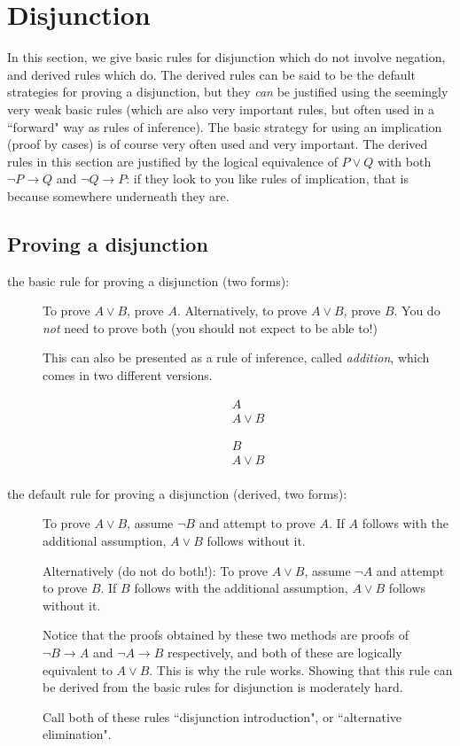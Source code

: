 \documentclass[12pt]{book}
\begin{document}
\section{Disjunction}

In this section, we give basic rules for disjunction which do not involve negation, and derived rules which do.  The derived rules can be said to be the default strategies for proving a disjunction, but they {\em can\/} be justified using the seemingly very weak basic rules (which are also very important rules, but often used in a ``forward" way as rules of inference).   The basic strategy for using an implication (proof by cases) is of course very often used and very important.  The derived rules in this section are justified by the logical equivalence of $P \vee Q$ with both $\neg P \rightarrow Q$ and $\neg Q \rightarrow P$:  if they look to you like rules of implication, that is because somewhere underneath they are.

\subsection{Proving a disjunction}

\begin{description}

\item[the basic rule for proving a disjunction (two forms):]  To prove $A \vee B$, prove $A$.   Alternatively, to prove $A \vee B$, prove $B$.
You do {\em not\/} need to prove both (you should not expect to be able to!)

This can also be presented as a rule of inference, called {\em addition\/}, which comes in two different versions.

$$\begin{array}{r} A \\ \hline A \vee B \end{array}$$

$$\begin{array}{r} B \\ \hline  A \vee B \\ \end{array}$$

\item[the default rule for proving a disjunction (derived, two forms):]   To prove $A \vee B$, assume $\neg B$ and attempt to prove $A$.  If $A$ follows with the additional assumption, $A \vee B$ follows without it.  

Alternatively (do not do both!):  To prove $A \vee B$, assume $\neg A$ and attempt to prove $B$.  If $B$ follows with the additional assumption, $A \vee B$ follows without it.

Notice that the proofs obtained by these two methods are proofs of $\neg B \rightarrow A$ and $\neg A \rightarrow B$ respectively, and both of these are logically equivalent to $A \vee B$.  This is why the rule works.  Showing that this rule can be derived from the basic rules for disjunction is moderately hard.

Call both of these rules ``disjunction introduction", or ``alternative elimination".


\end{description}
\end{document}
